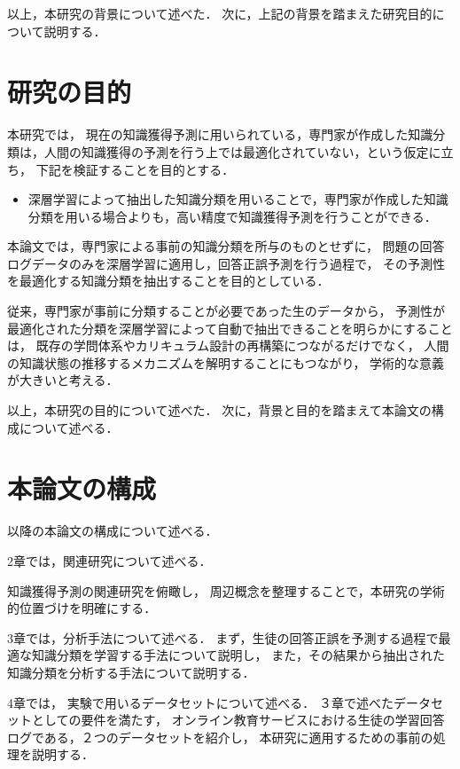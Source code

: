 \vvspace
以上，本研究の背景について述べた．
次に，上記の背景を踏まえた研究目的について説明する．

\section{研究の目的}
本研究では，
現在の知識獲得予測に用いられている，専門家が作成した知識分類は，人間の知識獲得の予測を行う上では最適化されていない，という仮定に立ち，
下記を検証することを目的とする．

\begin{itemize}
\item 深層学習によって抽出した知識分類を用いることで，専門家が作成した知識分類を用いる場合よりも，高い精度で知識獲得予測を行うことができる．
\end{itemize}

本論文では，専門家による事前の知識分類を所与のものとせずに，
問題の回答ログデータのみを深層学習に適用し，回答正誤予測を行う過程で，
その予測性を最適化する知識分類を抽出することを目的としている．

従来，専門家が事前に分類することが必要であった生のデータから，
予測性が最適化された分類を深層学習によって自動で抽出できることを明らかにすることは，
既存の学問体系やカリキュラム設計の再構築につながるだけでなく，
人間の知識状態の推移するメカニズムを解明することにもつながり，
学術的な意義が大きいと考える．


\vvspace
以上，本研究の目的について述べた．
次に，背景と目的を踏まえて本論文の構成について述べる．



\section{本論文の構成}
以降の本論文の構成について述べる．


2章では，関連研究について述べる．

知識獲得予測の関連研究を俯瞰し，
周辺概念を整理することで，本研究の学術的位置づけを明確にする．


3章では，分析手法について述べる．
まず，生徒の回答正誤を予測する過程で最適な知識分類を学習する手法について説明し，
また，その結果から抽出された知識分類を分析する手法について説明する．


4章では，
実験で用いるデータセットについて述べる．
３章で述べたデータセットとしての要件を満たす，
オンライン教育サービスにおける生徒の学習回答ログである，２つのデータセットを紹介し，
本研究に適用するための事前の処理を説明する．


